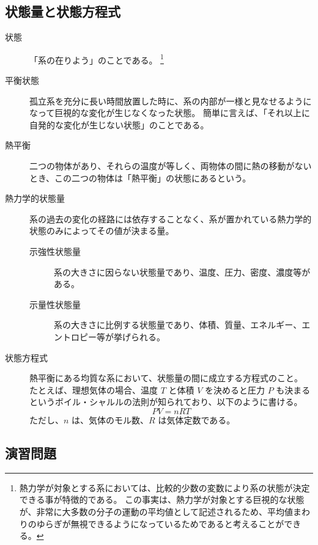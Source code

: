 \documentclass[uplatex,dvipdfmx,a4paper,11pt]{jsarticle}
\begin{document}
\subsection{状態量と状態方程式}
\begin{description}
\item[状態]
「系の在りよう」のことである。
\footnote
{
熱力学が対象とする系においては、比較的少数の変数により系の状態が決定できる事が特徴的である。
この事実は、熱力学が対象とする巨視的な状態が、非常に大多数の分子の運動の平均値として記述されるため、平均値まわりのゆらぎが無視できるようになっているためであると考えることができる。
}

\item[平衡状態]
孤立系を充分に長い時間放置した時に、系の内部が一様と見なせるようになって巨視的な変化が生じなくなった状態。
簡単に言えば、「それ以上に自発的な変化が生じない状態」のことである。

\item[熱平衡]
二つの物体があり、それらの温度が等しく、両物体の間に熱の移動がないとき、この二つの物体は「熱平衡」の状態にあるという。

\item[熱力学的状態量]
系の過去の変化の経路には依存することなく、系が置かれている熱力学的状態のみによってその値が決まる量。

\begin{description}
\item[示強性状態量]
系の大きさに因らない状態量であり、温度、圧力、密度、濃度等がある。
\item[示量性状態量]
系の大きさに比例する状態量であり、体積、質量、エネルギー、エントロピー等が挙げられる。
\end{description}

\item[状態方程式]
熱平衡にある均質な系において、状態量の間に成立する方程式のこと。
たとえば、理想気体の場合、温度 $T$ と体積 $V$ を決めると圧力 $P$ も決まるというボイル・シャルルの法則が知られており、以下のように書ける。
\begin{equation*}
PV = nRT
\end{equation*}
ただし、$n$ は、気体のモル数、$R$ は気体定数である。

\end{description}

\newpage

\subsection{演習問題}
\end{document}
